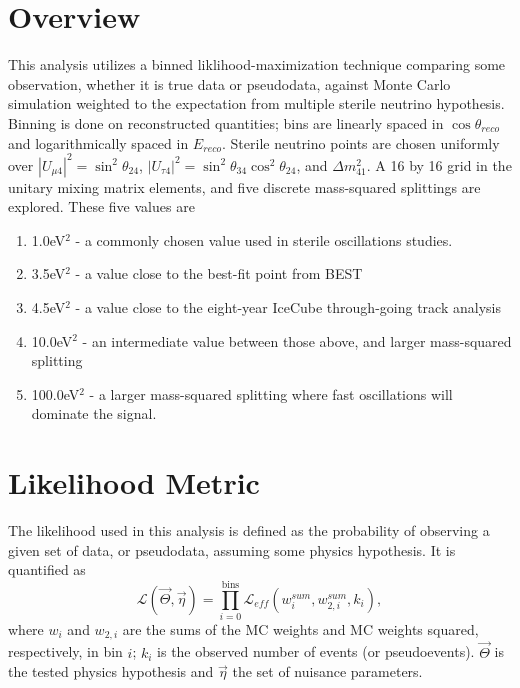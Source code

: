 \documentclass[main.tex]{subfiles}
\begin{document}
\section{Overview}

This analysis utilizes a binned liklihood-maximization technique comparing some observation, whether it is true data or pseudodata, against Monte Carlo simulation weighted to the expectation from multiple sterile neutrino hypothesis. 
Binning is done on reconstructed quantities; bins are linearly spaced in $\cos\theta_{reco}$ and logarithmically spaced in $E_{reco}$. 
Sterile neutrino points are chosen uniformly over $\left|U_{\mu 4}\right|^{2}=\sin^{2}\theta_{24}$, $\left|U_{\tau 4}\right|^{2}=\sin^{2}\theta_{34}\cos^{2}\theta_{24}$, and $\Delta m_{41}^{2}$. 
A 16 by 16 grid in the unitary mixing matrix elements, and five discrete mass-squared splittings are explored. 
These five values are 
\begin{enumerate}
    \item 1.0eV$^{2}$ - a commonly chosen value used in sterile oscillations studies. 
    \item 3.5eV$^{2}$ - a value close to the best-fit point from BEST~\cite{barinov2021results}
    \item 4.5eV$^{2}$ - a value close to the eight-year IceCube through-going track analysis~\cite{Aartsen_2020, Aartsen_2020_prd}
    \item 10.0eV$^{2}$ - an intermediate value between those above, and larger mass-squared splitting
    \item 100.0eV$^{2}$ - a larger mass-squared splitting where fast oscillations will dominate the signal. 
\end{enumerate}

\section{Likelihood Metric}\label{sect:llh_metric}

The likelihood used in this analysis is defined as the probability of observing a given set of data, or pseudodata, assuming some physics hypothesis.
It is quantified as 
\begin{equation}
    \mathcal{L}(\vec{\Theta}, \vec{\eta}) = \prod_{i=0}^{\text{bins}} \mathcal{L}_{eff}\left( w_{i}^{sum}, w_{2,i}^{sum}, k_{i} \right),
\end{equation}
where $w_{i}$ and $w_{2,i}$ are the sums of the MC weights and MC weights squared, respectively, in bin $i$; $k_{i}$ is the observed number of events (or pseudoevents). 
$\vec{\Theta}$ is the tested physics hypothesis and $\vec{\eta}$ the set of nuisance parameters. 
\end{document}
